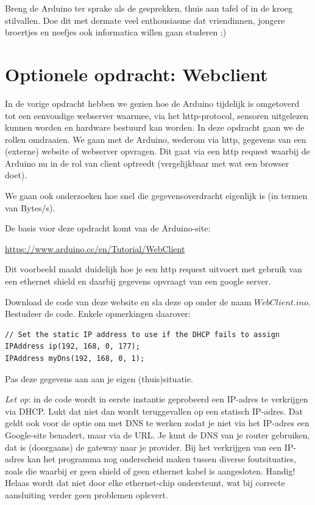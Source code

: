 \begin{exercise}
Breng de Arduino ter sprake als de gesprekken, thuis aan tafel of in de kroeg stilvallen. Doe dit met dermate veel enthousiasme dat vriendinnen, jongere broertjes en neefjes ook informatica willen gaan studeren ;)
\end{exercise}

\newpage

\section{Optionele opdracht: Webclient}
In de vorige opdracht hebben we gezien hoe de Arduino tijdelijk is omgetoverd tot een eenvoudige webserver waarmee, via het http-protocol, sensoren uitgelezen kunnen worden en hardware bestuurd kan worden. In deze opdracht gaan we de rollen omdraaien. We gaan met de Arduino, wederom via http, gegevens van een (externe) website of webserver opvragen. Dit gaat via een http request waarbij de Arduino nu in de rol van client optreedt (vergelijkbaar met wat een browser doet). \par 
We gaan ook onderzoeken hoe snel die gegevensoverdracht eigenlijk is (in termen van Bytes/s).

De basis voor deze opdracht komt van de Arduino-site: 

\url{https://www.arduino.cc/en/Tutorial/WebClient} 

Dit voorbeeld maakt duidelijk hoe je een http request uitvoert met gebruik van een ethernet shield en daarbij gegevens opvraagt van een google server.

\begin{exercise}
Download de code van deze website en sla deze op onder de naam $WebClient.ino$. Bestudeer de code. Enkele opmerkingen daarover:
\begin{lstlisting}[language=Arduino, numbers=none]
// Set the static IP address to use if the DHCP fails to assign
IPAddress ip(192, 168, 0, 177);
IPAddress myDns(192, 168, 0, 1);
\end{lstlisting}

Pas deze gegevens aan aan je eigen (thuis)situatie.
\end{exercise}

\begin{remark}\textit{Let op}: in de code wordt in eerste instantie geprobeerd een IP-adres te verkrijgen via DHCP. Lukt dat niet dan wordt teruggevallen op een statisch IP-adres. Dat geldt ook voor de optie om met DNS te werken zodat je niet via het IP-adres een Google-site benadert, maar via de URL. Je kunt de DNS van je router gebruiken, dat is (doorgaans) de gateway naar je provider. Bij het verkrijgen van een IP-adres kan het programma nog onderscheid maken tussen diverse foutsituaties, zoals die waarbij er geen shield of geen ethernet kabel is aangesloten. Handig! Helaas wordt dat niet door elke ethernet-chip ondersteunt, wat bij correcte aansluiting verder geen problemen oplevert.
\end{remark}

